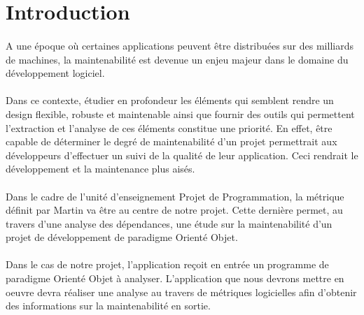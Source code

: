 \documentclass{scrartcl}
\begin{document}
\tableofcontents
\pagebreak











\section{Introduction}

    \paragraph{}A une époque où certaines applications peuvent être distribuées sur des milliards de machines, la maintenabilité est devenue un enjeu majeur dans le domaine du développement logiciel.

    \paragraph{}Dans ce contexte, étudier en profondeur les éléments qui semblent rendre un design flexible, robuste et maintenable ainsi que fournir des outils qui permettent l'extraction et l'analyse de ces éléments constitue une priorité. En effet, être capable de déterminer le degré de maintenabilité d'un projet permettrait aux développeurs d'effectuer un suivi de la qualité de leur application. Ceci rendrait le développement et la maintenance plus aisés.

    \paragraph{}Dans le cadre de l'unité d'enseignement \og Projet de Programmation\fg, la métrique définit par Martin\cite{Martin:1994} va être au centre de notre projet. Cette dernière permet, au travers d'une analyse des dépendances, une étude sur la maintenabilité d'un projet de développement de paradigme Orienté Objet. 

    \paragraph{}Dans le cas de notre projet, l'application reçoit en entrée un programme de paradigme Orienté Objet à analyser. L'application que nous devrons mettre en oeuvre devra réaliser une analyse au travers de métriques logicielles afin d'obtenir des informations sur la maintenabilité en sortie.
\end{document}
